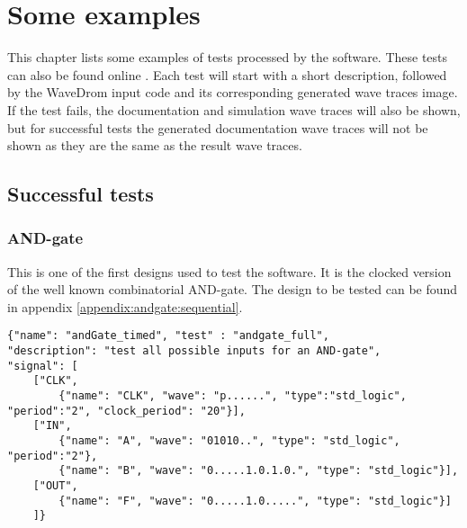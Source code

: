 \section{Some examples}\label{some_examples}
This chapter lists some examples of tests processed by the software. These tests can also be found online \cite{examples}.  Each test will start with a short description, followed by the WaveDrom input code and its corresponding generated wave traces image. If the test fails, the documentation and simulation wave traces will also be shown, but for successful tests the generated documentation wave traces will not be shown as they are the same as the result wave traces.
\subsection{Successful tests}
\subsubsection{AND-gate}
This is one of the first designs used to test the software. It is the clocked version of the well known combinatorial AND-gate. The  design to be tested can be found in appendix \ref{appendix:andgate:sequential}.
\begin{lstlisting}[style=json, caption={Full functionality test for the timed AND-gate design in appendix \ref{appendix:andgate:sequential}}, label={json:andgatefull_result}]
{"name": "andGate_timed", "test" : "andgate_full", 
"description": "test all possible inputs for an AND-gate", 
"signal": [
	["CLK",
		{"name": "CLK", "wave": "p......", "type":"std_logic", "period":"2", "clock_period": "20"}],
	["IN",
		{"name": "A", "wave": "01010..", "type": "std_logic", "period":"2"},
		{"name": "B", "wave": "0.....1.0.1.0.", "type": "std_logic"}],
	["OUT",
		{"name": "F", "wave": "0.....1.0.....", "type": "std_logic"}]
	]}
\end{lstlisting}
